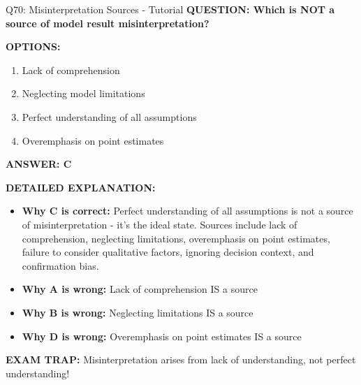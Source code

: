 \documentclass[8pt]{beamer}
\begin{document}
	\begin{frame}{Q70: Misinterpretation Sources - Tutorial}
		\fontsize{6.5}{7.5}\selectfont
		\textbf{QUESTION: Which is NOT a source of model result misinterpretation?}
		
		\vspace{0.1cm}
		\textbf{OPTIONS:}
		\begin{enumerate}
			\item Lack of comprehension
			\item Neglecting model limitations
			\item Perfect understanding of all assumptions
			\item Overemphasis on point estimates
		\end{enumerate}
		
		\vspace{0.1cm}
		\textcolor{myblue}{\textbf{ANSWER: C}}
		
		\vspace{0.1cm}
		\textbf{DETAILED EXPLANATION:}
		\begin{itemize}
			\item \textbf{Why C is correct:} Perfect understanding of all assumptions is not a source of misinterpretation - it's the ideal state. Sources include lack of comprehension, neglecting limitations, overemphasis on point estimates, failure to consider qualitative factors, ignoring decision context, and confirmation bias.
			\item \textbf{Why A is wrong:} Lack of comprehension IS a source
			\item \textbf{Why B is wrong:} Neglecting limitations IS a source
			\item \textbf{Why D is wrong:} Overemphasis on point estimates IS a source
		\end{itemize}
		
		\textcolor{myred}{\textbf{EXAM TRAP:}} Misinterpretation arises from \textcolor{myblue}{lack of understanding, not perfect understanding}!
	\end{frame}
	
\end{document}

